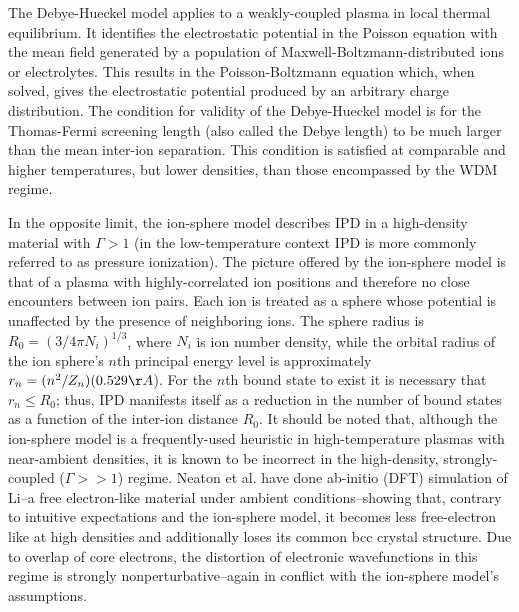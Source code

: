 \documentclass [11pt, proquest, article] {uwthesis}[2016/11/22]
\begin{document}
The Debye-Hueckel model applies to a weakly-coupled plasma in local thermal equilibrium. It identifies the electrostatic potential in the Poisson equation with the mean field generated by a population of Maxwell-Boltzmann-distributed ions or electrolytes. This results in the Poisson-Boltzmann equation which, when solved, gives the electrostatic potential produced by an arbitrary charge distribution. The condition for validity of the Debye-Hueckel model is for the Thomas-Fermi screening length (also called the Debye length) to be much larger than the mean inter-ion separation. This condition is satisfied at comparable and higher temperatures, but lower densities, than those encompassed by the WDM regime. \cite{smith1964bound} %

In the opposite limit, the ion-sphere model describes IPD in a high-density material with $\Gamma > 1$ (in the low-temperature context IPD is more commonly referred to as pressure ionization). The picture offered by the ion-sphere model is that of a plasma with highly-correlated ion positions and therefore no close encounters between ion pairs. Each ion is treated as a sphere whose potential is unaffected by the presence of neighboring ions. \cite{stewart1966lowering} The sphere radius is $R_0 = (3/4 \pi N_i)^{1/3}$, where $N_i$ is ion number density, while the orbital radius of the ion sphere's $n$th principal energy level is approximately $r_n = (n^2/Z_n)(0.529 \AA$). For the $n$th bound state to exist it is necessary that $r_n \leq R_0$; thus, IPD manifests itself as a reduction in the number of bound states as a function of the inter-ion distance $R_0$. It should be noted that, although the ion-sphere model is a frequently-used heuristic in high-temperature plasmas with near-ambient densities, it is known to be incorrect in the high-density, strongly-coupled ($\Gamma >> 1$) regime. Neaton et al. have done ab-initio (DFT) simulation of Li--a free electron-like material under ambient conditions--showing that, contrary to intuitive expectations and the ion-sphere model, it becomes less free-electron like at high densities and additionally loses its common bcc crystal structure. \cite{neaton1999pairing} Due to overlap of core electrons, the distortion of electronic wavefunctions in this regime is strongly nonperturbative--again in conflict with the ion-sphere model's assumptions. 
\end{document}
